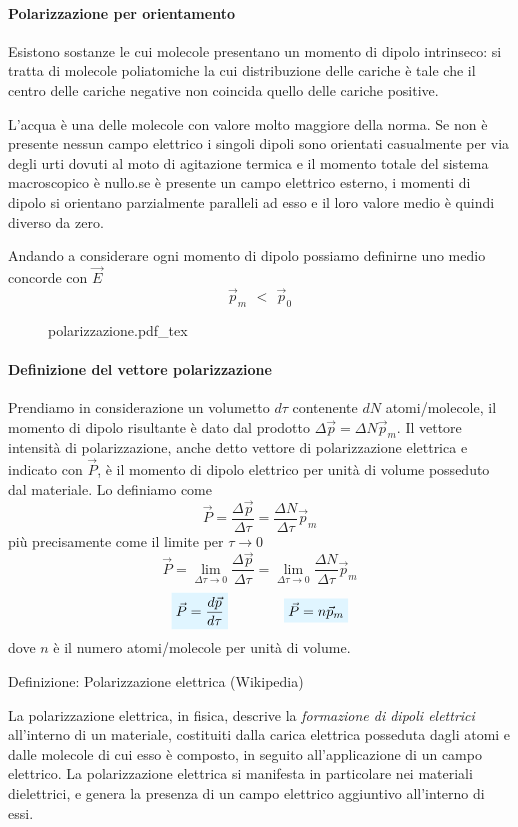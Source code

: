 \documentclass[x11names]{report}
\newcommand{\definizione}[2]{
	\begin{center}
		\fboxsep11pt
		\colorbox{myblue}{\begin{minipage}{5.75in}
				\begin{blues}{Definizione: #1}
					#2
				\end{blues}
		\end{minipage}}
	\end{center}
}
\newcommand{\incfig}[1]{%
	{#1.pdf_tex}
}
\newcommand{\viola}[1]{%
	\colorbox{myblue}{$\displaystyle #1$}
}
\begin{document}
\paragraph*{Polarizzazione per orientamento} \label{orient}
Esistono sostanze le cui molecole presentano un momento di dipolo intrinseco: si tratta di molecole poliatomiche la cui distribuzione delle cariche è tale che il centro delle cariche negative non coincida quello delle cariche positive. 

L'acqua è una delle molecole con valore molto maggiore della norma. Se non è presente nessun campo elettrico i singoli dipoli sono orientati casualmente per via degli urti dovuti al moto di agitazione termica e il momento totale del sistema macroscopico è nullo.se è presente un campo elettrico esterno, i momenti di dipolo si orientano parzialmente paralleli ad esso e il loro valore medio è quindi diverso da zero.

Andando a considerare ogni momento di dipolo possiamo definirne uno medio concorde con \(\vec{E}\)
\[
\vec{p}_m \,\ < \,\ \vec{p}_0
\]

\begin{figure}[H]
	\centering
	\incfig{polarizzazione}
\end{figure}
 
\paragraph*{Definizione del vettore polarizzazione}
Prendiamo in considerazione un volumetto \(d\tau\) contenente \(dN\) atomi/molecole, il momento di dipolo risultante è dato dal prodotto \(\Delta\vec{p} = \Delta N \vec{p}_m\).  Il vettore intensità di polarizzazione, anche detto vettore di polarizzazione elettrica e indicato con \(\vec{P}\), è il momento di dipolo elettrico per unità di volume posseduto dal materiale. Lo definiamo come
\[
\vec{P} =\frac{\Delta \vec{p}}{\Delta\tau} = \frac{\Delta N}{\Delta \tau}\vec{p}_m
\]
più precisamente come il limite per \(\tau \to 0\)
\[
\vec{P} = \lim_{\Delta\tau\to 0}\frac{\Delta \vec{p}}{\Delta\tau} = \lim_{\Delta\tau\to 0}\frac{\Delta N}{\Delta \tau}\vec{p}_m
\]
\begin{equation}
\viola{\vec{P}= \frac{d \vec{p}}{d\tau}} \qquad \qquad	\viola{\vec{P} = n\vec{p}_m}
\end{equation}
dove \(n\) è il numero atomi/molecole per unità di volume. 
\definizione{Polarizzazione elettrica (Wikipedia)}{
La polarizzazione elettrica, in fisica, descrive la \textit{formazione di dipoli elettrici} all'interno di un materiale, costituiti dalla carica elettrica posseduta dagli atomi e dalle molecole di cui esso è composto, in seguito all'applicazione di un campo elettrico. La polarizzazione elettrica si manifesta in particolare nei materiali dielettrici, e genera la presenza di un campo elettrico aggiuntivo all'interno di essi.}
\end{document}
